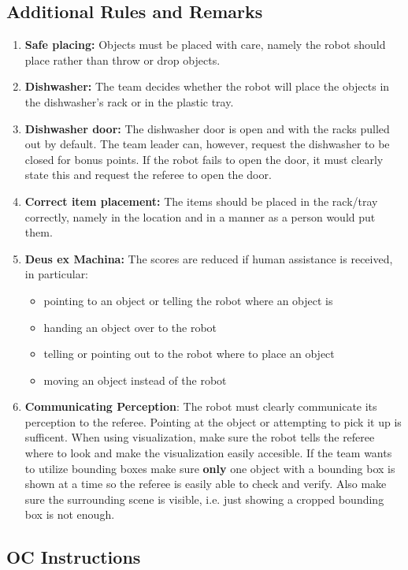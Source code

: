 \subsection*{Additional Rules and Remarks}
\begin{enumerate}[nosep]
	\item \textbf{Safe placing:} Objects must be placed with care, namely the robot should place rather than throw or drop objects.
	\item \textbf{Dishwasher:} The team decides whether the robot will place the objects in the dishwasher's rack or in the plastic tray.
	\item \textbf{Dishwasher door:} The dishwasher door is open and with the racks pulled out by default.
	The team leader can, however, request the dishwasher to be closed for bonus points. If the robot fails to open the door, it must clearly state this and request the referee to open the door.
	\item \textbf{Correct item placement:} The items should be placed in the rack/tray correctly, namely in the location and in a manner as a person would put them.
	\item \textbf{Deus ex Machina:} The scores are reduced if human assistance is received, in particular:
	\begin{itemize}[nosep]
		\item pointing to an object or telling the robot where an object is
		\item handing an object over to the robot
		\item telling or pointing out to the robot where to place an object
		\item moving an object instead of the robot
	\end{itemize}
	\item \textbf{Communicating Perception}: The robot must clearly communicate its perception to the referee.
	Pointing at the object or attempting to pick it up is sufficent. When using visualization, make sure the robot 
	tells the referee where to look and make the visualization easily accesible. 
	If the team wants to utilize bounding boxes make sure \textbf{only} one object with a bounding box is shown 
	at a time so the referee is easily able to check and verify. Also make sure the surrounding scene is visible, i.e.
	just showing a cropped bounding box is not enough.
\end{enumerate}

\subsection*{OC Instructions}

